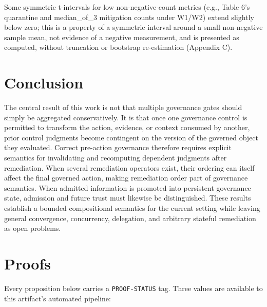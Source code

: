 \documentclass[11pt,a4paper]{article}
\theoremstyle{definition}
\begin{document}
Some symmetric t-intervals for low non-negative-count metrics (e.g., Table 6's quarantine and median\_of\_3 mitigation counts under W1/W2) extend slightly below zero; this is a property of a symmetric interval around a small non-negative sample mean, not evidence of a negative measurement, and is presented as computed, without truncation or bootstrap re-estimation (Appendix C).

\section{Conclusion}

The central result of this work is not that multiple governance gates should simply be aggregated conservatively. It is that once one governance control is permitted to transform the action, evidence, or context consumed by another, prior control judgments become contingent on the version of the governed object they evaluated. Correct pre-action governance therefore requires explicit semantics for invalidating and recomputing dependent judgments after remediation. When several remediation operators exist, their ordering can itself affect the final governed action, making remediation order part of governance semantics. When admitted information is promoted into persistent governance state, admission and future trust must likewise be distinguished. These results establish a bounded compositional semantics for the current setting while leaving general convergence, concurrency, delegation, and arbitrary stateful remediation as open problems.

\appendix
\section{Proofs}

Every proposition below carries a \texttt{PROOF-STATUS} tag. Three values are available to this artifact's automated pipeline:
\end{document}

